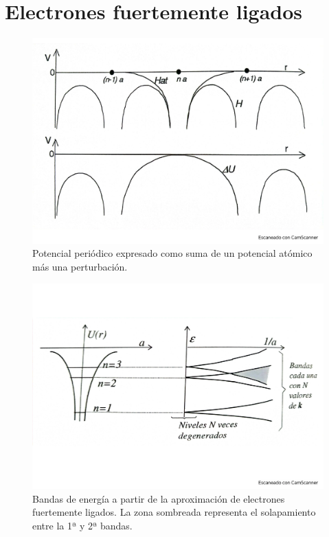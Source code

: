 \section{Electrones fuertemente ligados}

\begin{figure}[h!] \centering
    \includegraphics[scale=0.5]{Cuerpo/Ch_07/Fotos libro 5.pdf}
    \caption{Potencial periódico expresado como suma de un potencial atómico más una perturbación.}
    \label{Fig:07-05}
\end{figure}    
\begin{figure}[h!] \centering
    \includegraphics[scale=0.5]{Cuerpo/Ch_07/Fotos libro 6.pdf}
    \caption{Bandas de energía a partir de la aproximación de electrones fuertemente ligados. La zona sombreada representa el solapamiento entre la 1ª y 2ª bandas.}
    \label{Fig:07-06}
\end{figure}    

